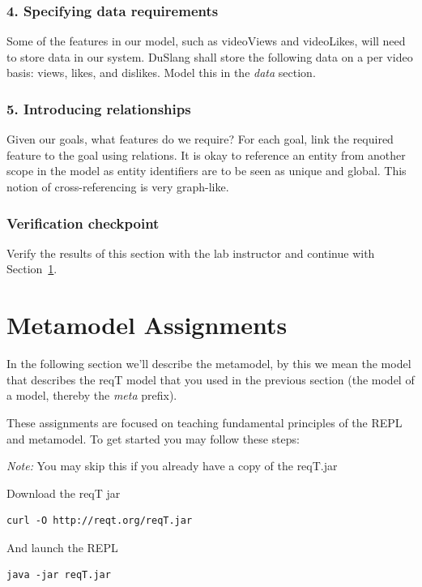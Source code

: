 \documentclass[11pt]{article}
\begin{document}

\subsubsection*{4. Specifying data requirements}
Some of the features in our model, such as videoViews and videoLikes, will need to store data in our system. DuSlang shall store the following data on a per video basis: views, likes, and dislikes. Model this in the \textit{data} section.

\subsubsection*{5. Introducing relationships}
Given our goals, what features do we require? For each goal, link the required feature to the goal using relations. It is okay to reference an entity from another scope in the model as entity identifiers are to be seen as unique and global. This notion of cross-referencing is very graph-like.

\subsubsection*{Verification checkpoint}
Verify the results of this section with the lab instructor and continue with Section~\ref{section:extraAssignments}.

%
%
\section{Metamodel Assignments}\label{section:extraAssignments}
In the following section we'll describe the metamodel, by this we mean the model that describes the reqT model that you used in the previous section (the model of a model, thereby the \textit{meta} prefix).

These assignments are focused on teaching fundamental principles of the REPL and metamodel. To get started you may follow these steps:

\textit{Note:} You may skip this if you already have a copy of the reqT.jar

\begin{framed}
\noindent Download the reqT jar
{\small\begin{verbatim}
curl -O http://reqt.org/reqT.jar
\end{verbatim}}
\noindent And launch the REPL
{\small\begin{verbatim}
java -jar reqT.jar
\end{verbatim}}
\end{framed}
\end{document}
